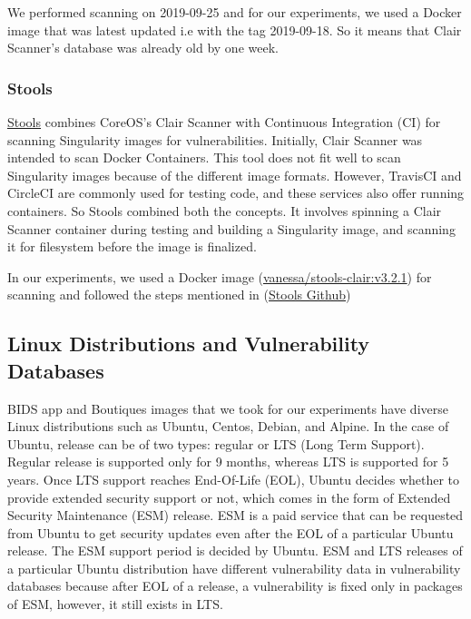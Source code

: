 \documentclass[a4paper,num-refs]{oup-contemporary}
\begin{document}
We performed scanning on 2019-09-25 and for our experiments, we used a Docker image that was 
latest updated i.e with the tag 2019-09-18. So it means that Clair Scanner's database was already
old by one week.


\subsubsection{Stools}

\href{https://github.com/singularityhub/stools}{Stools} combines CoreOS's Clair Scanner with Continuous Integration (CI)
for scanning Singularity images for vulnerabilities.
Initially, Clair Scanner was intended to scan Docker Containers. This tool does not fit well
to scan Singularity images because of the different image formats.
However, TravisCI and CircleCI are commonly used for testing code, and these
services also offer running containers. So Stools combined both the concepts.
It involves spinning a Clair Scanner container during testing and building a
Singularity image, and scanning it for filesystem before the image is finalized.

In our experiments, we used a Docker image (\href{https://hub.docker.com/r/vanessa/stools-clair}{vanessa/stools-clair:v3.2.1})
for scanning and followed the steps mentioned in (\href{https://github.com/singularityhub/stools}{Stools Github})

\subsection{Linux Distributions and Vulnerability Databases}

BIDS app and Boutiques images that we took for our experiments have diverse Linux
distributions such as Ubuntu, Centos, Debian, and Alpine. In the case of Ubuntu, release
can be of two types: regular or LTS (Long Term Support).
Regular release is supported only for 9 months, whereas LTS is supported for 5 years. Once LTS support
reaches End-Of-Life (EOL), Ubuntu decides whether to provide extended security support or not, which comes
in the form of Extended Security Maintenance (ESM) release.
ESM is a paid service that can be requested from Ubuntu to get security 
updates even after the EOL of a particular Ubuntu release. The ESM support period is decided by
Ubuntu. ESM and LTS releases of a particular Ubuntu distribution have different vulnerability
data in vulnerability databases because after EOL of a release, a vulnerability is fixed only in packages of ESM, however, it still
exists in LTS.
\end{document}
